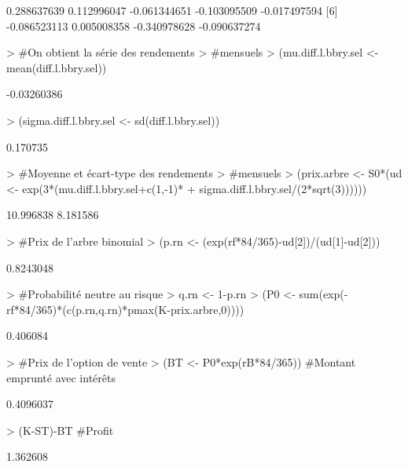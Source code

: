 \documentclass{article}
\begin{document}
\begin{Schunk}
\begin{Soutput}
[1]  0.288637639  0.112996047 -0.061344651 -0.103095509 -0.017497594
[6] -0.086523113  0.005008358 -0.340978628 -0.090637274
\end{Soutput}
\begin{Sinput}
>                                         #On obtient la série des rendements
>                                         #mensuels
> (mu.diff.l.bbry.sel <- mean(diff.l.bbry.sel))
\end{Sinput}
\begin{Soutput}
[1] -0.03260386
\end{Soutput}
\begin{Sinput}
> (sigma.diff.l.bbry.sel <- sd(diff.l.bbry.sel))
\end{Sinput}
\begin{Soutput}
[1] 0.170735
\end{Soutput}
\begin{Sinput}
>                                         #Moyenne et écart-type des rendements 
>                                         #mensuels
> (prix.arbre <- S0*(ud <- exp(3*(mu.diff.l.bbry.sel+c(1,-1)*
+                                 sigma.diff.l.bbry.sel/(2*sqrt(3))))))
\end{Sinput}
\begin{Soutput}
[1] 10.996838  8.181586
\end{Soutput}
\begin{Sinput}
>                                         #Prix de l'arbre binomial
> (p.rn <- (exp(rf*84/365)-ud[2])/(ud[1]-ud[2]))
\end{Sinput}
\begin{Soutput}
[1] 0.8243048
\end{Soutput}
\begin{Sinput}
>                                         #Probabilité neutre au risque
> q.rn <- 1-p.rn
> (P0 <- sum(exp(-rf*84/365)*(c(p.rn,q.rn)*pmax(K-prix.arbre,0))))
\end{Sinput}
\begin{Soutput}
[1] 0.406084
\end{Soutput}
\begin{Sinput}
>                                         #Prix de l'option de vente
> (BT <- P0*exp(rB*84/365)) #Montant emprunté avec intérêts
\end{Sinput}
\begin{Soutput}
[1] 0.4096037
\end{Soutput}
\begin{Sinput}
> (K-ST)-BT  #Profit
\end{Sinput}
\begin{Soutput}
[1] 1.362608
\end{Soutput}
\end{Schunk}
\end{document}
